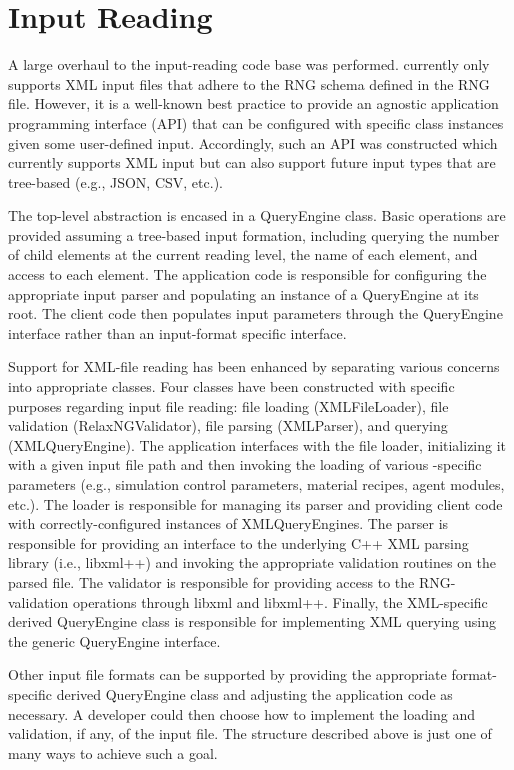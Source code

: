 \section{Input Reading }

A large overhaul to the input-reading code base was performed. \Cyclus currently
only supports XML input files that adhere to the RNG schema defined in the
\Cyclus RNG file. However, it is a well-known best practice to provide an
agnostic application programming interface (API) that can be configured with
specific class instances given some user-defined input. Accordingly, such an API
was constructed which currently supports XML input but can also support future
input types that are tree-based (e.g., JSON, CSV, etc.).

The top-level abstraction is encased in a QueryEngine class. Basic operations
are provided assuming a tree-based input formation, including querying the
number of child elements at the current reading level, the name of each element,
and access to each element. The application code is responsible for configuring
the appropriate input parser and populating an instance of a QueryEngine at its
root. The client code then populates input parameters through the QueryEngine
interface rather than an input-format specific interface.

Support for XML-file reading has been enhanced by separating various concerns
into appropriate classes. Four classes have been constructed with specific
purposes regarding input file reading: file loading (XMLFileLoader), file
validation (RelaxNGValidator), file parsing (XMLParser), and querying
(XMLQueryEngine). The application interfaces with the file loader, initializing
it with a given input file path and then invoking the loading of various
\Cyclus-specific parameters (e.g., simulation control parameters, material
recipes, agent modules, etc.). The loader is responsible for managing its parser
and providing client code with correctly-configured instances of
XMLQueryEngines. The parser is responsible for providing an interface to the
underlying C++ XML parsing library (i.e., libxml++) and invoking the appropriate
validation routines on the parsed file. The validator is responsible for
providing access to the RNG-validation operations through libxml and
libxml++. Finally, the XML-specific derived QueryEngine class is responsible for
implementing XML querying using the generic QueryEngine interface.

Other input file formats can be supported by providing the appropriate
format-specific derived QueryEngine class and adjusting the application code as
necessary. A developer could then choose how to implement the loading and
validation, if any, of the input file. The structure described above is just one
of many ways to achieve such a goal.
